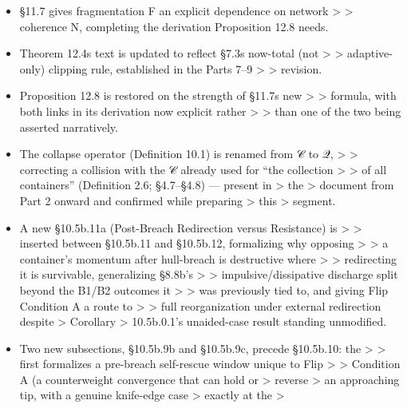 \documentclass[
]{article}
\begin{document}
\begin{itemize}
  \textgreater{} \textgreater{} C\_A := d\_A directly and both
  sections\textquotesingle{} formulas for R\_g now \textgreater{}
  \textgreater{} agree.
\item
  §11.7 gives fragmentation F an explicit dependence on network
  \textgreater{} \textgreater{} coherence N, completing the derivation
  Proposition 12.8 needs.
\item
  Theorem 12.4\textquotesingle s text is updated to reflect
  §7.3\textquotesingle s now-total (not \textgreater{} \textgreater{}
  adaptive-only) clipping rule, established in the Parts 7--9
  \textgreater{} \textgreater{} revision.
\item
  Proposition 12.8 is restored on the strength of
  §11.7\textquotesingle s new \textgreater{} \textgreater{} formula,
  with both links in its derivation now explicit rather \textgreater{}
  \textgreater{} than one of the two being asserted narratively.
\item
  The collapse operator (Definition 10.1) is renamed from 𝒞 to 𝒬,
  \textgreater{} \textgreater{} correcting a collision with the 𝒞
  already used for ``the collection \textgreater{} \textgreater{} of all
  containers'' (Definition 2.6; §4.7--§4.8) --- present in
  \textgreater{} the \textgreater{} document from Part 2 onward and
  confirmed while preparing \textgreater{} this \textgreater{} segment.
\item
  A new §10.5b.11a (Post-Breach Redirection versus Resistance) is
  \textgreater{} \textgreater{} inserted between §10.5b.11 and
  §10.5b.12, formalizing why opposing \textgreater{} \textgreater{} a
  container's momentum after hull-breach is destructive where
  \textgreater{} \textgreater{} redirecting it is survivable,
  generalizing §8.8b's \textgreater{} \textgreater{}
  impulsive/dissipative discharge split beyond the B1/B2 outcomes it
  \textgreater{} \textgreater{} was previously tied to, and giving Flip
  Condition A a route to \textgreater{} \textgreater{} full
  reorganization under external redirection despite \textgreater{}
  Corollary \textgreater{} 10.5b.0.1's unaided-case result standing
  unmodified.
\item
  Two new subsections, §10.5b.9b and §10.5b.9c, precede §10.5b.10: the
  \textgreater{} \textgreater{} first formalizes a pre-breach
  self-rescue window unique to Flip \textgreater{} \textgreater{}
  Condition A (a counterweight convergence that can hold or
  \textgreater{} reverse \textgreater{} an approaching tip, with a
  genuine knife-edge case \textgreater{} exactly at the \textgreater{}

\end{itemize}
\end{document}

